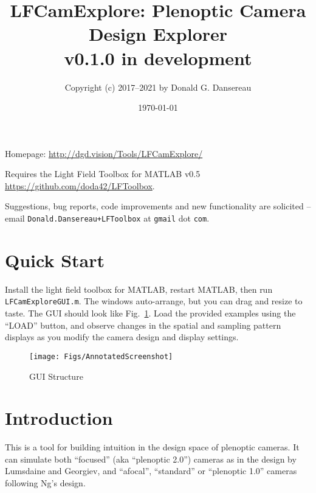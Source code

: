 \documentclass[onecolumn]{article}
\title{
LFCamExplore: Plenoptic Camera Design Explorer\\
{\large v0.1.0 in development }}
\author{Copyright (c) 2017--2021 by Donald G. Dansereau}
\date{\today}
\newcommand{\SymbolText}[1]{\texttt{\small #1}}
\begin{document}
\maketitle
\thispagestyle{empty}\pagestyle{plain}

\noindent
Homepage: \url{http://dgd.vision/Tools/LFCamExplore/}

\vspace{1em}\noindent
Requires the Light Field Toolbox for MATLAB v0.5 \url{https://github.com/doda42/LFToolbox}.

\vspace{1em}\noindent 
Suggestions, bug reports, code improvements and new functionality are solicited -- email \SymbolText{Donald.Dansereau+LFToolbox} \small{at} \SymbolText{gmail} \small{dot} \SymbolText{com}.


\newpage
\tableofcontents
\newpage

\section{Quick Start}

Install the light field toolbox for MATLAB, restart MATLAB, then run \SymbolText{LFCamExploreGUI.m}.  The windows auto-arrange, but you can drag and resize to taste.  The GUI should look like Fig.~\ref{fig_AnnotatedScreenshot}.  Load the provided examples using the ``LOAD'' button, and observe changes in the spatial and sampling pattern displays as you modify the camera design and display settings.

\begin{figure}[h!]
	\centering
	\texttt{[image: Figs/AnnotatedScreenshot]}
	\caption{GUI Structure}
	\label{fig_AnnotatedScreenshot}
\end{figure}



\section{Introduction}

This is a tool for building intuition in the design space of plenoptic cameras.  It can simulate both ``focused'' (aka ``plenoptic 2.0'') cameras as in the design by Lumsdaine and Georgiev, and ``afocal'', ``standard'' or ``plenoptic 1.0'' cameras following Ng's design.
\end{document}

